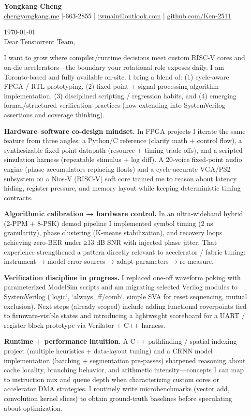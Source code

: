 \documentclass[11pt]{article}
\begin{document}
{\Large \textbf{Yongkang Cheng}}\\[2pt]
\href{https://chengyongkang.me/}{chengyongkang.me} \;|-663-2855 \;|\; \href{mailto:iwmain@outlook.com}{iwmain@outlook.com} \;|\; \href{https://github.com/Ken-2511}{github.com/Ken-2511}

\today\\[0.9em]

Dear Tenstorrent Team,

I want to grow where compiler/runtime decisions meet custom RISC‑V cores and on‑die accelerators—the boundary your rotational role exposes daily. I am Toronto‑based and fully available on‑site. I bring a blend of: (1) cycle‑aware FPGA / RTL prototyping, (2) fixed‑point + signal‑processing algorithm implementation, (3) disciplined scripting / regression habits, and (4) emerging formal/structured verification practices (now extending into SystemVerilog assertions and coverage thinking).

\textbf{Hardware–software co‑design mindset.} In FPGA projects I iterate the same feature from three angles: a Python/C reference (clarify math + control flow), a synthesizable fixed‑point datapath (resource + timing trade‑offs), and a scripted simulation harness (repeatable stimulus + log diff). A 20‑voice fixed‑point audio engine (phase accumulators replacing floats) and a cycle‑accurate VGA/PS2 subsystem on a Nios‑V (RISC‑V) soft core trained me to reason about latency hiding, register pressure, and memory layout while keeping deterministic timing contracts.

\textbf{Algorithmic calibration → hardware control.} In an ultra‑wideband hybrid (2‑PPM + 8‑PSK) demod pipeline I implemented symbol timing (2 ns granularity), phase clustering (K‑means stabilization), and recovery loops achieving zero‑BER under ≥13 dB SNR with injected phase jitter. That experience strengthened a pattern directly relevant to accelerator / fabric tuning: instrument → model error sources → adapt parameters → re‑measure.

\textbf{Verification discipline in progress.} I replaced one‑off waveform poking with parameterized ModelSim scripts and am migrating selected Verilog modules to SystemVerilog (`logic`, `always_ff/comb`, simple SVA for reset sequencing, mutual exclusion). Next steps (already scoped) include adding functional coverpoints tied to firmware‑visible states and introducing a lightweight scoreboard for a UART / register block prototype via Verilator + C++ harness.

\textbf{Runtime + performance intuition.} A C++ pathfinding / spatial indexing project (multiple heuristics + data‑layout tuning) and a CRNN model implementation (batching + segmentation pre‑passes) sharpened reasoning about cache locality, branching behavior, and arithmetic intensity—concepts I can map to instruction mix and queue depth when characterizing custom cores or accelerator DMA strategies. I routinely write microbenchmarks (vector add, convolution kernel slices) to obtain ground‑truth baselines before speculating about optimization.
\end{document}
